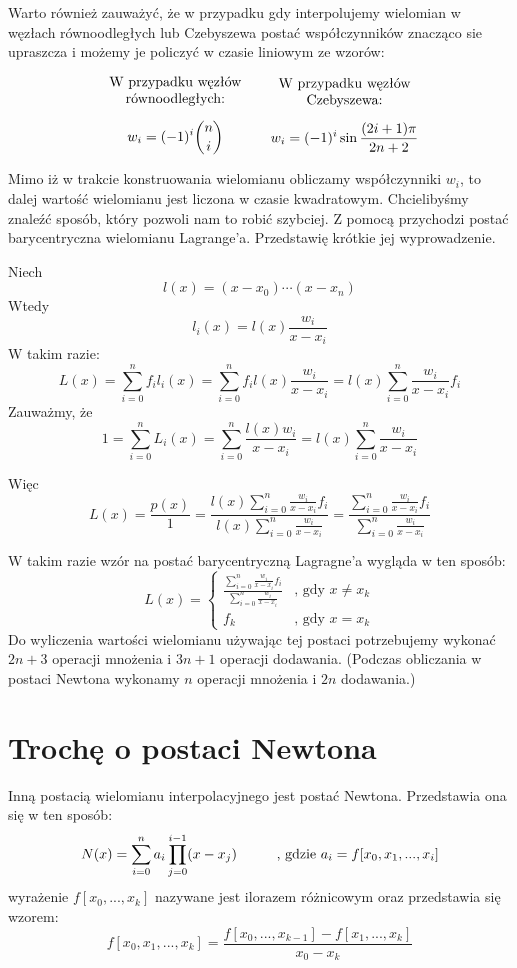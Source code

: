 \documentclass[a4paper]{article}
\begin{document}
Warto również zauważyć, że w przypadku gdy interpolujemy wielomian w węzłach równoodległych lub Czebyszewa
postać współczynników znacząco sie upraszcza i możemy je policzyć w czasie liniowym ze wzorów:

\[
  \begin{minipage}{.35\linewidth}
    \centering
    W przypadku węzłów równoodległych:
    $$ w_i = (-1)^i\binom{n}{i}$$
  \end{minipage}
  \begin{minipage}{.35\linewidth}
    \centering
    W przypadku węzłów Czebyszewa:
    $$ w_i = (-1)^i\sin{\frac{(2i+1)\pi}{2n+2}}$$
  \end{minipage}
\]

Mimo iż w trakcie konstruowania wielomianu obliczamy współczynniki $w_i$, to dalej wartość wielomianu
jest liczona w czasie kwadratowym. Chcielibyśmy znaleźć sposób, który pozwoli nam to robić szybciej.
Z pomocą przychodzi postać barycentryczna wielomianu Lagrange'a. Przedstawię krótkie jej wyprowadzenie.

Niech $$l(x) = (x - x_0) \cdots (x - x_n)$$ 
Wtedy $$l_i(x) = l(x)\frac{w_i}{x-x_i}$$
W takim razie:
$$ L(x) = \sum_{i=0}^{n}f_il_i(x) = \sum_{i=0}^nf_il(x)\frac{w_i}{x-x_i} = 
          l(x)\sum_{i=0}^n\frac{w_i}{x-x_i}f_i $$
Zauważmy, że 
$$ 1 = \sum_{i=0}^nL_i(x) = \sum_{i=0}^n\frac{l(x)w_i}{x-x_i} = l(x)\sum_{i=0}^n\frac{w_i}{x-x_i}$$

Więc
$$  L(x) = \frac{p(x)}{1} = 
\frac{l\displaystyle(x)\sum_{i=0}^n\frac{w_i}{x-x_i}f_i}{l\displaystyle(x)\sum_{i=0}^n\frac{w_i}{x-x_i}} = 
\frac{\displaystyle\sum_{i=0}^n\frac{w_i}{x-x_i}f_i}{\displaystyle\sum_{i=0}^n\frac{w_i}{x-x_i}}$$

W takim razie wzór na postać barycentryczną Lagragne'a wygląda w ten sposób:
\color{black}
$$ L(x) = 
          \begin{cases}
            \frac{\displaystyle\sum_{i=0}^n \frac{w_i}{x - x_i}f_i}{\displaystyle\sum_{i=0}^n \frac{w_i}{x - x_i}} & \text{, gdy } x \neq x_k \\
              f_k & \text{, gdy } x = x_k
          \end{cases}
        $$
Do wyliczenia wartości wielomianu używając tej postaci potrzebujemy wykonać 
$2n+3$ operacji mnożenia i $3n+1$ operacji dodawania. (Podczas obliczania 
w postaci Newtona wykonamy $n$ operacji mnożenia i $2n$ dodawania.)

\color{red}
\section{Trochę o postaci Newtona}
Inną postacią wielomianu interpolacyjnego jest postać Newtona. Przedstawia ona się
w ten sposób:
$$ N(x) = \sum_{i=0}^n a_i \prod_{j = 0}^{i-1}(x - x_j) \text{\hspace{1cm}, gdzie }
a_i = f[x_0, x_1, ..., x_i]$$
wyrażenie $ f[x_0, ..., x_k] $ nazywane jest ilorazem różnicowym oraz przedstawia 
się wzorem:
$$ f[x_0, x_1, ..., x_k] = \frac{f[x_0, ..., x_{k-1}] - f[x_1, ..., x_k]}{x_0 - x_k}$$
\end{document}
